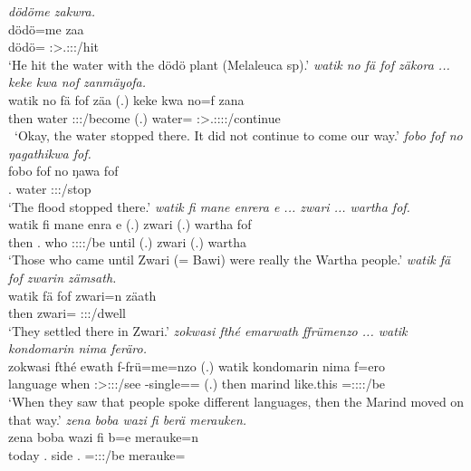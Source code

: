 \begin{exe}
	\emph{dödöme zakwra.}\\
	\gll dödö=me zaa\\ 
	dödö={\Ins} \Sg:\Sbj>\Tsg.\F:\Obj:\Pst:\Pfv/hit\\
	\trans `He hit the water with the dödö plant (Melaleuca sp).'
	\emph{watik no fä fof zäkora ... keke kwa nof zanmäyofa.}\\
	\gll watik no fä fof zäa (.) keke kwa no=f zana\\ 
	then water {\Dist} {\Emph} \Sg:\Sbj:\Pst:\Ipfv/become (.) {\Neg} {\Fut} water={\Erg} \Sg:\Sbj>\Tsg.\F:\Obj:\Pst:\Pfv:\Venit/continue\\\
	\trans `Okay, the water stopped there. It did not continue to come our way.'
\exi{73} 
	\emph{fobo fof no ŋagathikwa fof.}\\
	\gll fobo fof no ŋawa fof\\ 
	\Dist.{\All} {\Emph} water \Sg:\Sbj:\Pst:\Ipfv/stop \Emph\\
	\trans `The flood stopped there.'
	\emph{watik fi mane enrera e ... zwari ... wartha fof.}\\
	\gll watik fi mane enra e (.) zwari (.) wartha fof\\ 
	then \Third.{\Abs} who \Sg:\Sbj:\Pst:\Ipfv:\Venit/be until (.) zwari (.) wartha {\Emph}\\
	\trans `Those who came until Zwari (= Bawi) were really the Wartha people.'
\exi{75} 
	\emph{watik fä fof zwarin zämsath.}\\
	\gll watik fä fof zwari=n zäath\\ 
	then {\Dist} {\Emph} zwari={\Loc} \Stpl:\Sbj:\Pst:\Pfv/dwell\\
	\trans `They settled there in Zwari.'
	\emph{zokwasi fthé emarwath ffrümenzo ... watik kondomarin nima feräro.}\\
	\gll zokwasi fthé e\stem{mar}wath f-frü=me=nzo (.) watik kondomarin nima f=ero\\ 
	language when \Stpl:\Sbj>\Stpl:\Obj:\Pst:\Ipfv/see \Redup-single=\Ins={\Only} (.) then marind like.this \Dist=\Stpl:\Sbj:\Pst:\Ipfv:\Andat/be\\
	\trans `When they saw that people spoke different languages, then the Marind moved on that way.'
\exi{77} 
	\emph{zena boba wazi fi berä merauken.}\\
	\gll zena boba wazi fi b=e merauke=n\\ 
	today \Med.{\Abl} side \Third.{\Abs} \Med=\Stpl:\Sbj:\Nonpast:\Ipfv/be merauke=\Loc\\

\end{exe}

